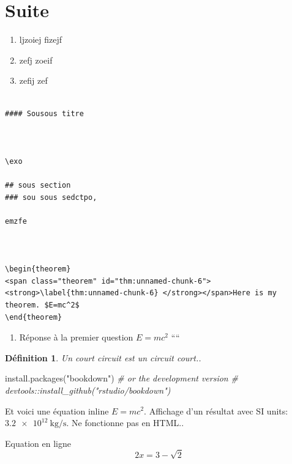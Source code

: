 \documentclass[
]{book}
\newenvironment{Shaded}{\begin{snugshade}}{\end{snugshade}}
\newcommand{\CommentTok}[1]{\textcolor[rgb]{0.56,0.35,0.01}{\textit{#1}}}
\newcommand{\FunctionTok}[1]{\textcolor[rgb]{0.00,0.00,0.00}{#1}}
\newcommand{\NormalTok}[1]{#1}
\newcommand{\StringTok}[1]{\textcolor[rgb]{0.31,0.60,0.02}{#1}}
\providecommand{\tightlist}{%
  \setlength{\itemsep}{0pt}\setlength{\parskip}{0pt}}
\newtheorem{definition}{Définition}
\newtheorem{theorem}{Application}
\def\tightlist{}
\newcounter{numeroexo}
\newcommand{\exo}{\par\noindent\stepcounter{numeroexo}
	\hspace{-.25cm}\fbox{\textbf{Exercice \arabic{numeroexo}}}\quad}
\begin{document}
\hypertarget{suite}{%
\section{Suite}\label{suite}}

\begin{enumerate}
\def\labelenumi{\arabic{enumi}.}
\tightlist
\item
  ljzoiej fizejf
\item
  zefj zoeif
\item
  zefij zef
\end{enumerate}

\begin{verbatim}

#### Sousous titre



\exo 

## sous section
### sou sous sedctpo,

emzfe



\begin{theorem}
<span class="theorem" id="thm:unnamed-chunk-6"><strong>\label{thm:unnamed-chunk-6} </strong></span>Here is my theorem. $E=mc^2$
\end{theorem}
\end{verbatim}

\begin{enumerate}
\def\labelenumi{\arabic{enumi}.}
\tightlist
\item
  Réponse à la premier question \(E=mc^2\)
  ````
\end{enumerate}

\begin{definition}
\protect\hypertarget{def:unnamed-chunk-7}{}{\label{def:unnamed-chunk-7} }Un court circuit est un circuit court..
\end{definition}

\begin{Shaded}
\begin{Highlighting}[]
\FunctionTok{install.packages}\NormalTok{(}\StringTok{"bookdown"}\NormalTok{)}
\CommentTok{\# or the development version}
\CommentTok{\# devtools::install\_github("rstudio/bookdown")}
\end{Highlighting}
\end{Shaded}

Et voici une équation inline \(E=mc^2\). Affichage d'un résultat avec SI units: \(\SI{3.2e12}{\kilo\gram\per\second}\). Ne fonctionne pas en HTML..

Equation en ligne \[2x  = 3 -\sqrt{2}\]
\end{document}
